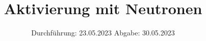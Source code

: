 

%

\subject{V702}
\title{Aktivierung mit Neutronen}
\date{%
  Durchführung: 23.05.2023
  \hspace{3em}
  Abgabe: 30.05.2023
}


\setlength{\parindent}{0pt} %

\maketitle
\thispagestyle{empty}
\tableofcontents
\newpage



%



\printbibliography{}




